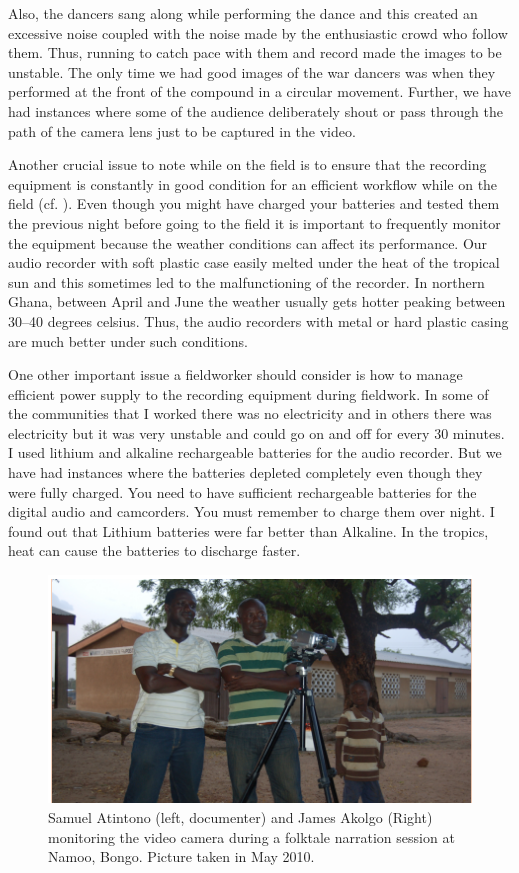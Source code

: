 \documentclass[output=paper,colorlinks,citecolor=brown]{langscibook}
\begin{document}
Also, the dancers sang along while performing the dance and this created an excessive noise coupled with the noise made by the enthusiastic crowd who follow them. Thus, running to catch pace with them and record made the images to be unstable. The only time we had good images of the war dancers was when they performed at the front of the compound in a circular movement. Further, we have had instances where some of the audience deliberately shout or pass through the path of the camera lens just to be captured in the video.

Another crucial issue to note while on the field is to ensure that the recording equipment is constantly in good condition for an efficient workflow while on the field (cf. \citealt{Bowern2015}). Even though you might have charged your batteries and tested them the previous night before going to the field it is important to frequently monitor the equipment because the weather conditions can affect its performance. Our audio recorder with soft plastic case easily melted under the heat of the tropical sun and this sometimes led to the malfunctioning of the recorder. In northern Ghana, between April and June the weather usually gets hotter peaking between 30--40 degrees celsius. Thus, the audio recorders with metal or hard plastic casing are much better under such conditions.

One other important issue a fieldworker should consider is how to manage efficient power supply to the recording equipment during fieldwork. In some of the communities that I worked there was no electricity and in others there was electricity but it was very unstable and could go on and off for every 30 minutes. I used lithium and alkaline rechargeable batteries for the audio recorder. But we have had instances where the batteries depleted completely even though they were fully charged. You need to have sufficient rechargeable batteries for the digital audio and camcorders. You must remember to charge them over night. I found out that Lithium batteries were far better than Alkaline. In the tropics, heat can cause the batteries to discharge faster.

\begin{figure}
\includegraphics[width=\textwidth]{figures/samuel.png}
\caption{Samuel Atintono (left, documenter) and James Akolgo (Right) monitoring the video 
 		camera during a folktale narration session at Namoo, Bongo. Picture taken in May 2010.}

\end{figure}
\end{document}
